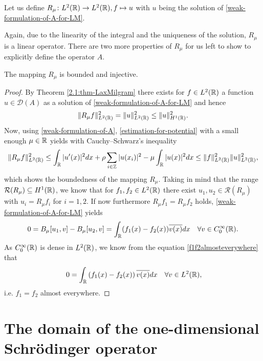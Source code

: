 \begin{definition}
	Let us define $R_{\mu} \colon L^{2}(\mathbb{R}) \rightarrow L^{2}(\mathbb{R}), f \mapsto u$ with $u$ being the solution of \eqref{weak-formulation-of-A-for-LM}.
\end{definition}
Again, due to the linearity of the integral and the uniqueness of the solution, $R_{\mu}$ is a linear operator. There are two more properties of $R_{\mu}$ for us left to show to explicitly define the operator $A$. 
\begin{theorem} \label{rmuinj}
	The mapping $R_{\mu}$ is bounded and injective.
	
	\begin{proof}
		By Theorem \ref{2.1:thm-LaxMilgram} there exists for $f \in L^{2}(\mathbb{R})$ a function $u \in \mathcal{D}(A)$ as a solution of \eqref{weak-formulation-of-A-for-LM} and hence
		\[ \| R_{\mu} f \|_{L^{2}(\mathbb{R})}^{2} = \| u \|_{L^{2}(\mathbb{R})}^{2} \leq \| u \|_{H^{1}(\mathbb{R})}^{2}. \] 
		Now, using \eqref{weak-formulation-of-A}, \eqref{estimation-for-potential} with a small enough $\mu \in \mathbb{R}$ yields with Cauchy–Schwarz's inequality
		\[ \| R_{\mu} f \|_{L^{2}(\mathbb{R})}^{2} \leq \int_{\mathbb{R}} |u'(x)|^{2} dx + \rho \sum_{i \in \mathbb{Z}} |u(x_{i})|^{2} - \mu \int_{\mathbb{R}} |u(x)|^{2} dx \leq \| f \|_{L^{2}(\mathbb{R})}^{2} \| u \|_{L^{2}(\mathbb{R})}^{2}, \]	
		which shows the boundedness of the mapping $R_{\mu}$. Taking in mind that the range $\mathcal{R}(R_{\mu}) \subseteq H^{1}(\mathbb{R})$, we know that for $f_{1}, f_{2} \in L^{2}(\mathbb{R})$ there exist  $u_{1}, u_{2} \in \mathcal{R}(R_{\mu})$ with $u_{i} = R_{\mu} f_{i}$ for $i = 1, 2$. If now furthermore $R_{\mu} f_{1} = R_{\mu} f_{2}$ holds, \eqref{weak-formulation-of-A-for-LM} yields
		\begin{equation}
			0 = B_{\mu}[u_{1}, v] - B_{\mu}[u_{2}, v] = \int_{\mathbb{R}} (f_{1}(x) - f_{2}(x)) \overline{v(x)} dx \quad \forall v \in C_{0}^{\infty}(\mathbb{R}). \label{f1f2almosteverywhere}
		\end{equation} 
		As $C_{0}^{\infty}(\mathbb{R})$ is dense in $L^{2}(\mathbb{R})$, we know from the equation \eqref{f1f2almosteverywhere} that
		\[ 0 = \int_{\R} \left(f_{1}(x) - f_{2}(x)\right) \overline{v(x)} dx \quad \forall v \in L^{2}(\R), \]
		i.e. $f_{1} = f_{2}$ almost everywhere.
	\end{proof}
\end{theorem}

\section{The domain of the one-dimensional Schrödinger operator} \label{sec:3.2}

